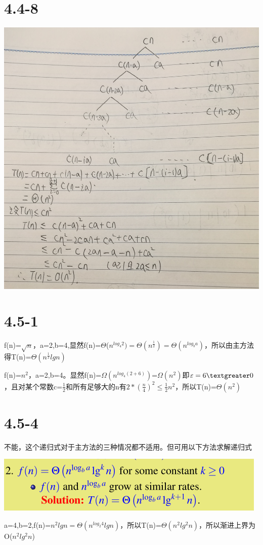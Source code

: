 \documentclass[UTF8]{ctexart}
\begin{document}
	\section*{4.4-8}
	\includegraphics[scale=0.15]{HW2-pic.jpg}
	\section*{4.5-1}
	\par{f(n)=$\sqrt{n}$，a=2,b=4,显然f(n)=$\Theta$($n^{log_{4}2})=\Theta(n^{\frac{1}{2}})=\Theta(n^{log_{b}a})$，所以由主方法得T(n)=$\Theta(n^{\frac{1}{2}}lgn)$}
	\par{}
	\par{f(n)=$n^{2}$，a=2,b=4。显然f(n)=$\Omega(n^{log_{4}(2+6)})$=$\Omega(n^{2})$即$\varepsilon=6\textgreater0$，且对某个常数c=$\frac{1}{2}$和所有足够大的n有$2*(\frac{n}{4})^{2}\le \frac{1}{2}n^{2}$，所以T(n)=$\Theta(n^{2})$}
	\section*{4.5-4}
	\par{不能，这个递归式对于主方法的三种情况都不适用。但可用以下方法求解递归式}
	
	\includegraphics[scale=0.5]{HW2-PIC-2.png}
	\par{a=4,b=2,f(n)=$n^{2}lgn=\Theta(n^{log_{2}4}lgn)$，所以T(n)=$\Theta(n^{2}lg^{2}n)$，所以渐进上界为O($n^{2}lg^{2}n$)}
\end{document}
